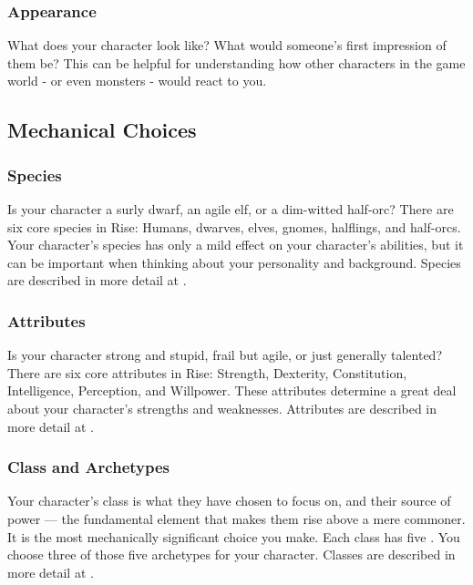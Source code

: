         \subsubsection{Appearance}
            What does your character look like?
            What would someone's first impression of them be?
            This can be helpful for understanding how other characters in the game world - or even monsters - would react to you.

    \subsection{Mechanical Choices}

        \subsubsection{Species}
            Is your character a surly dwarf, an agile elf, or a dim-witted half-orc?
            There are six core species in Rise: Humans, dwarves, elves, gnomes, halflings, and half-orcs.
            Your character's species has only a mild effect on your character's abilities, but it can be important when thinking about your personality and background.
            Species are described in more detail at .

        \subsubsection{Attributes}
            Is your character strong and stupid, frail but agile, or just generally talented?
            There are six core attributes in Rise: Strength, Dexterity, Constitution, Intelligence, Perception, and Willpower.
            These attributes determine a great deal about your character's strengths and weaknesses.
            Attributes are described in more detail at .

        \subsubsection{Class and Archetypes}
            Your character's class is what they have chosen to focus on, and their source of power --- the fundamental element that makes them rise above a mere commoner.
            It is the most mechanically significant choice you make.
            Each class has five .
            You choose three of those five archetypes for your character.
            Classes are described in more detail at .

